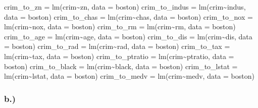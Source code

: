 \documentclass[
]{article}
\newenvironment{Shaded}{\begin{snugshade}}{\end{snugshade}}
\newcommand{\AttributeTok}[1]{\textcolor[rgb]{0.77,0.63,0.00}{#1}}
\newcommand{\FunctionTok}[1]{\textcolor[rgb]{0.00,0.00,0.00}{#1}}
\newcommand{\NormalTok}[1]{#1}
\newcommand{\OtherTok}[1]{\textcolor[rgb]{0.56,0.35,0.01}{#1}}
\newcommand{\SpecialCharTok}[1]{\textcolor[rgb]{0.00,0.00,0.00}{#1}}
\begin{document}
\begin{Shaded}
\begin{Highlighting}[]
\NormalTok{crim\_to\_zn }\OtherTok{=} \FunctionTok{lm}\NormalTok{(crim}\SpecialCharTok{\textasciitilde{}}\NormalTok{zn, }\AttributeTok{data =}\NormalTok{ boston)}
\NormalTok{crim\_to\_indus }\OtherTok{=} \FunctionTok{lm}\NormalTok{(crim}\SpecialCharTok{\textasciitilde{}}\NormalTok{indus, }\AttributeTok{data =}\NormalTok{ boston)}
\NormalTok{crim\_to\_chas }\OtherTok{=} \FunctionTok{lm}\NormalTok{(crim}\SpecialCharTok{\textasciitilde{}}\NormalTok{chas, }\AttributeTok{data =}\NormalTok{ boston)}
\NormalTok{crim\_to\_nox }\OtherTok{=} \FunctionTok{lm}\NormalTok{(crim}\SpecialCharTok{\textasciitilde{}}\NormalTok{nox, }\AttributeTok{data =}\NormalTok{ boston)}
\NormalTok{crim\_to\_rm }\OtherTok{=} \FunctionTok{lm}\NormalTok{(crim}\SpecialCharTok{\textasciitilde{}}\NormalTok{rm, }\AttributeTok{data =}\NormalTok{ boston)}
\NormalTok{crim\_to\_age }\OtherTok{=} \FunctionTok{lm}\NormalTok{(crim}\SpecialCharTok{\textasciitilde{}}\NormalTok{age, }\AttributeTok{data =}\NormalTok{ boston)}
\NormalTok{crim\_to\_dis }\OtherTok{=} \FunctionTok{lm}\NormalTok{(crim}\SpecialCharTok{\textasciitilde{}}\NormalTok{dis, }\AttributeTok{data =}\NormalTok{ boston)}
\NormalTok{crim\_to\_rad }\OtherTok{=} \FunctionTok{lm}\NormalTok{(crim}\SpecialCharTok{\textasciitilde{}}\NormalTok{rad, }\AttributeTok{data =}\NormalTok{ boston)}
\NormalTok{crim\_to\_tax }\OtherTok{=} \FunctionTok{lm}\NormalTok{(crim}\SpecialCharTok{\textasciitilde{}}\NormalTok{tax, }\AttributeTok{data =}\NormalTok{ boston)}
\NormalTok{crim\_to\_ptratio }\OtherTok{=} \FunctionTok{lm}\NormalTok{(crim}\SpecialCharTok{\textasciitilde{}}\NormalTok{ptratio, }\AttributeTok{data =}\NormalTok{ boston)}
\NormalTok{crim\_to\_black }\OtherTok{=} \FunctionTok{lm}\NormalTok{(crim}\SpecialCharTok{\textasciitilde{}}\NormalTok{black, }\AttributeTok{data =}\NormalTok{ boston)}
\NormalTok{crim\_to\_lstat }\OtherTok{=} \FunctionTok{lm}\NormalTok{(crim}\SpecialCharTok{\textasciitilde{}}\NormalTok{lstat, }\AttributeTok{data =}\NormalTok{ boston)}
\NormalTok{crim\_to\_medv }\OtherTok{=} \FunctionTok{lm}\NormalTok{(crim}\SpecialCharTok{\textasciitilde{}}\NormalTok{medv, }\AttributeTok{data =}\NormalTok{ boston)}
\end{Highlighting}
\end{Shaded}

\hypertarget{b.-1}{%
\subsubsection{b.)}\label{b.-1}}
\end{document}
